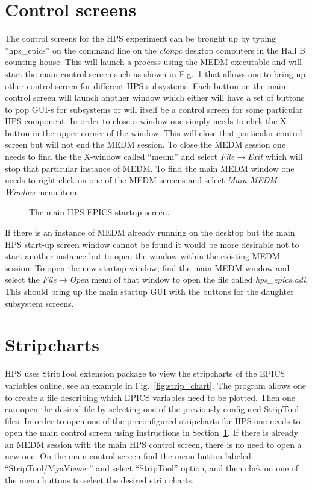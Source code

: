 \documentclass[letter,10pt]{article}
\begin{document}
\section{Control screens}
\label{sec:control_screens}
The control screens for the HPS experiment can be brought up by typing ''hps\_epics'' on the command line on the \textit{clonpc\*} desktop 
computers in the Hall B counting house. This will launch a process using the MEDM executable and will start the  
main control screen such as shown in Fig.~\ref{fig:hps_epics_screen} that allows one to bring up other control screen for 
different HPS subsystems. 
Each button on the main control screen will launch another window which either will have a set of buttons to pop GUI-s for subsystems or will 
itself be a control screen for some particular HPS component. In order to close a window one simply needs to click the X-button in the upper 
corner of the window. This will close that particular control screen but will not end the MEDM session. To close the MEDM session one 
needs to find the the X-window called ``medm'' and select \textit{File}$\rightarrow$\textit{Exit} which will stop that particular instance of MEDM. 
To find the main MEDM window one needs to right-click on one of the MEDM screens and select \textit{Main MEDM Window} menu item. 
 \begin{figure}
  \centering
  \caption{The main HPS EPICS startup screen.} 
  \label{fig:hps_epics_screen}
 \end{figure}

If there is an instance of MEDM already running on the desktop but the main HPS start-up screen window cannot be found it would be more 
desirable not to start another instance but to open the window within the existing MEDM session. To open the new startup window, find the main 
MEDM window and select the \textit{File}$\rightarrow$\textit{Open} menu of that window to open the file called \textit{hps\_epics.adl}. This should 
bring up the main startup GUI with the buttons for the daughter subsystem screens. 

\section{Stripcharts}
HPS uses StripTool extension package to view the stripcharts of the EPICS variables online, see an example 
in Fig.~\ref{fig:strip_chart}. 
The program allows one to create a file describing which EPICS variables need to be plotted. Then one 
can open the desired file by selecting one of the previously configured StripTool files.
In order to open one of the preconfigured stripcharts for HPS one needs to open the main control screen using instructions 
in Section~\ref{sec:control_screens}. If there is already an MEDM session with the main HPS control screen, there is no need to open 
a new one. On the main control screen find the menu button labeled ``StripTool/MyaViewer'' and select ``StripTool'' option, and then 
click on one of the menu buttons to select the desired strip charts. 
\end{document}
